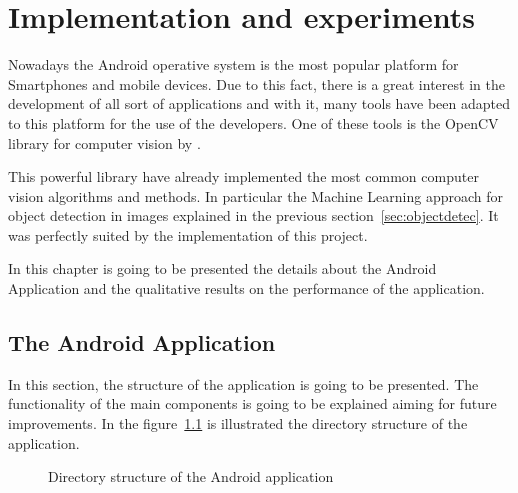 \chapter{Implementation and experiments}  
\label{cha:android}

Nowadays the Android operative system is the most popular platform for
Smartphones and mobile devices. Due to this fact, there is a great interest in
the development of all sort of applications and with it, many tools have
been adapted to this platform for the use of the developers. One of these tools
is the OpenCV library for computer vision by \cite{opencv}.

This powerful library have already implemented the most common computer vision
algorithms and methods. In particular the Machine Learning approach
for object detection in images explained in the previous
section~\ref{sec:objectdetec}.  It was perfectly suited by the implementation of this
project.

In this chapter is going to be presented the details about the Android
Application and the qualitative results on the performance of the application.

\section{The Android Application} %
\label{sec:androidapp}

In this section, the structure of the application is going to be presented. The
functionality of the main components is going to be explained aiming for future
improvements. In the figure~\ref{fig:andrivedir} is illustrated the directory
structure of the application.

\begin{figure}
    \centering\small
    \begin{minipage}[t]{0.6\linewidth}
    \end{minipage}
\caption{Directory structure of the Android application}
\label{fig:andrivedir}
\end{figure}

